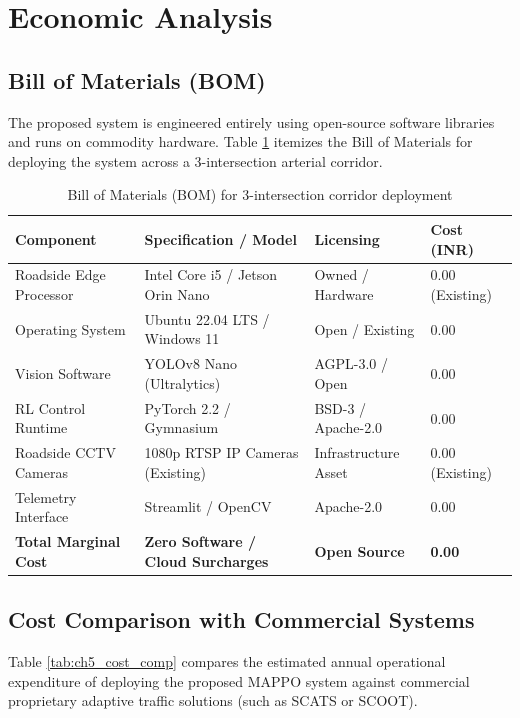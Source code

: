 \section{Economic Analysis}
\label{sec:ch5_economic_analysis}

\subsection{Bill of Materials (BOM)}
The proposed system is engineered entirely using open-source software libraries and runs on commodity hardware. Table \ref{tab:ch5_bom} itemizes the Bill of Materials for deploying the system across a 3-intersection arterial corridor.

\begin{table}[htbp]
\centering
\small
\caption{Bill of Materials (BOM) for 3-intersection corridor deployment}
\label{tab:ch5_bom}
\begin{tabularx}{\textwidth}{|p{3.8cm}|p{4.5cm}|p{3.2cm}|X|}
\hline
\textbf{Component} & \textbf{Specification / Model} & \textbf{Licensing} & \textbf{Cost (INR)} \\ \hline
Roadside Edge Processor & Intel Core i5 / Jetson Orin Nano & Owned / Hardware & 0.00 (Existing) \\ \hline
Operating System & Ubuntu 22.04 LTS / Windows 11 & Open / Existing & 0.00 \\ \hline
Vision Software & YOLOv8 Nano (Ultralytics) & AGPL-3.0 / Open & 0.00 \\ \hline
RL Control Runtime & PyTorch 2.2 / Gymnasium & BSD-3 / Apache-2.0 & 0.00 \\ \hline
Roadside CCTV Cameras & 1080p RTSP IP Cameras (Existing) & Infrastructure Asset & 0.00 (Existing) \\ \hline
Telemetry Interface & Streamlit / OpenCV & Apache-2.0 & 0.00 \\ \hline
\textbf{Total Marginal Cost} & \textbf{Zero Software / Cloud Surcharges} & \textbf{Open Source} & \textbf{0.00} \\ \hline
\end{tabularx}
\end{table}

\subsection{Cost Comparison with Commercial Systems}
Table \ref{tab:ch5_cost_comp} compares the estimated annual operational expenditure of deploying the proposed MAPPO system against commercial proprietary adaptive traffic solutions (such as SCATS or SCOOT).

